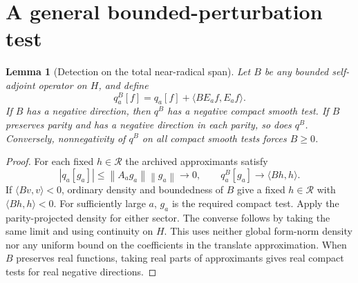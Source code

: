 \documentclass[11pt]{article}
\newtheorem{lemma}[theorem]{Lemma}
\newcommand{\norm}[1]{\left\|#1\right\|}
\begin{document}
\section{A general bounded-perturbation test}
\begin{lemma}[Detection on the total near-radical span]
Let $B$ be any bounded self-adjoint operator on $H$, and define
\[
 q_a^B[f]=q_a[f]+\langle BE_af,E_af\rangle.
\]
If $B$ has a negative direction, then $q^B$ has a negative compact
smooth test. If $B$ preserves parity and has a negative direction
in each parity, so does $q^B$. Conversely, nonnegativity of $q^B$
on all compact smooth tests forces $B\ge0$.
\end{lemma}
\begin{proof}
For each fixed $h\in\mathcal R$ the archived approximants satisfy
\[
 |q_a[g_a]|\le\norm{A_ag_a}\norm{g_a}\longrightarrow0,
 \qquad q_a^B[g_a]\longrightarrow\langle Bh,h\rangle.
\]
If $\langle Bv,v\rangle<0$, ordinary density and boundedness of $B$
give a fixed $h\in\mathcal R$ with $\langle Bh,h\rangle<0$.
For sufficiently large $a$, $g_a$ is the required compact test.
Apply the parity-projected density for either sector. The converse
follows by taking the same limit and using continuity on $H$.
This uses neither global form-norm density nor any uniform bound
on the coefficients in the translate approximation.
When $B$ preserves real functions, taking real parts of approximants
gives real compact tests for real negative directions.
\end{proof}
\end{document}
